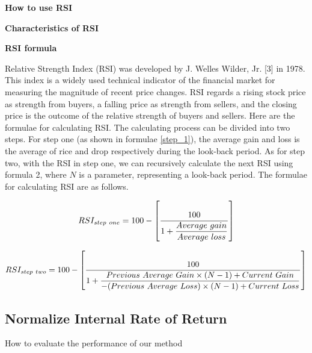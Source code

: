 \documentclass[../main.tex]{subfiles}
\begin{document}
\textbf{How to use RSI}

\textbf{Characteristics of RSI}

\textbf{RSI formula}

Relative Strength Index (RSI) was developed by J. Welles Wilder, Jr. [3] in 1978. This index is a widely used technical indicator of the financial market for measuring the magnitude of recent price changes. RSI regards a rising stock price as strength from buyers, a falling price as strength from sellers, and the closing price is the outcome of the relative strength of buyers and sellers. Here are the formulae for calculating RSI. The calculating process can be divided into two steps. For step one (as shown in formulae \ref{step_1}), the average gain and loss is the average of rice and drop respectively during the look-back period. As for step two, with the RSI in step one, we can recursively calculate the next RSI using formula 2, where $N$ is a parameter, representing a look-back period. The formulae for calculating RSI are as follows.

\begin{equation}\label{step_1}\scalebox{1}
    {$RSI_{step\ one}=100-\left[\dfrac{100}{1+\dfrac{Average\ gain}{Average\ loss}}\right]$}
    \vspace{1em}
\end{equation}

\begin{equation}\label{step_2}\scalebox{1}
    {$RSI_{step\ two}=100-\left[\dfrac{100}{1+\dfrac{Previous\ Average\ Gain\times(N-1)+Current\ Gain}{-(Previous\ Average\ Loss)\times(N-1)+Current\ Loss}}\right]$}
    \vspace{1em}
\end{equation}

\subsection{Normalize Internal Rate of Return}
How to evaluate the performance of our method





\end{document}
